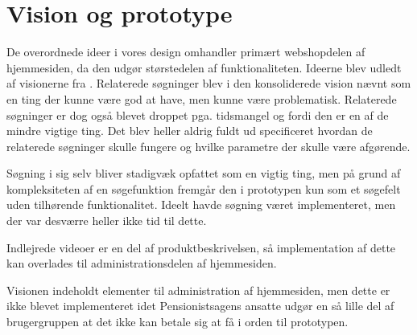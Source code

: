 \section{Vision og prototype}

De overordnede ideer i vores design omhandler primært webshopdelen af
hjemmesiden, da den udgør størstedelen af funktionaliteten. Ideerne blev
udledt af visionerne fra \cite{opgave3}. Relaterede søgninger blev i den
konsoliderede vision nævnt som en ting der kunne være god at have, men
kunne være problematisk. Relaterede søgninger er dog også blevet droppet
pga. tidsmangel og fordi den er en af de mindre vigtige ting. Det blev heller
aldrig fuldt ud specificeret hvordan de relaterede søgninger skulle fungere
og hvilke parametre der skulle være afgørende.

Søgning i sig selv bliver stadigvæk opfattet som en vigtig ting, men på
grund af kompleksiteten af en søgefunktion fremgår den i prototypen kun som
et søgefelt uden tilhørende funktionalitet. Ideelt havde søgning været
implementeret, men der var desværre heller ikke tid til dette.

Indlejrede videoer er en del af produktbeskrivelsen, så implementation af
dette kan overlades til administrationsdelen af hjemmesiden.

Visionen indeholdt elementer til administration af hjemmesiden, men dette er
ikke blevet implementeret idet Pensionistsagens ansatte udgør en så lille del
af brugergruppen at det ikke kan betale sig at få i orden til prototypen.
